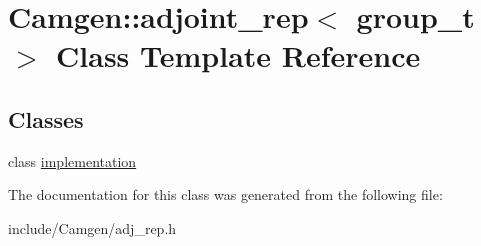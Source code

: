 \hypertarget{a00006}{\section{Camgen\-:\-:adjoint\-\_\-rep$<$ group\-\_\-t $>$ Class Template Reference}
\label{a00006}
}
\subsection*{Classes}
\begin{DoxyCompactItemize}
\item 
class \hyperlink{a00281}{implementation}
\end{DoxyCompactItemize}


The documentation for this class was generated from the following file\-:\begin{DoxyCompactItemize}
\item 
include/\-Camgen/adj\-\_\-rep.\-h\end{DoxyCompactItemize}
